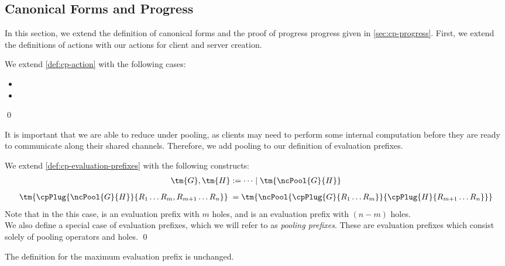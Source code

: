 \documentclass[UKenglish]{llncs}
\begin{document}
\subsection{Canonical Forms and Progress}
In this section, we extend the definition of canonical forms and the proof of
progress progress given in \cref{sec:cp-progress}.
First, we extend the definitions of actions with our actions for client and
server creation.
\begin{definition}[Action]\label{def:nc-action}
  We extend \cref{def:cp-action} with the following cases:
  \begin{itemize}[noitemsep,topsep=0pt,parsep=0pt,partopsep=0pt]
  \item {}
  \item {}
  \end{itemize}    
  \qed
\end{definition}
It is important that we are able to reduce under pooling, as clients may need to
perform some internal computation before they are ready to communicate along
their shared channels.
Therefore, we add pooling to our definition of evaluation prefixes.
\begin{definition}\label{def:nc-evaluation-prefixes}
  We extend \cref{def:cp-evaluation-prefixes} with the following constructs:
  \begin{align*}
    \tm{G}, \tm{H} := \dots \mid \tm{\ncPool{G}{H}}
  \end{align*}
  \begin{align*}
    \tm{\cpPlug{\ncPool{G}{H}}{R_1 \dots R_m, R_{m+1} \dots R_{n}}} \; =
    \tm{\ncPool{\cpPlug{G}{R_1 \dots R_m}}{\cpPlug{H}{R_{m+1} \dots R_n}}}
  \end{align*}
  Note that in the this case,  is an evaluation prefix with $m$ holes,
  and  is an evaluation prefix with $(n-m)$ holes.
  \\
  We also define a special case of evaluation prefixes, which we will refer to
  as \emph{pooling prefixes}. These are evaluation prefixes which consist solely
  of pooling operators and holes. 
  \qed
\end{definition}
The definition for the maximum evaluation prefix is unchanged.
\end{document}
